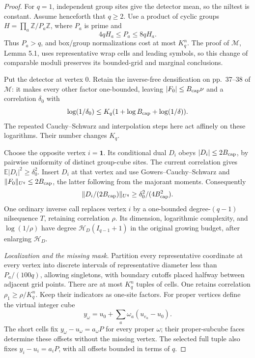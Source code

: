 \documentclass[11pt,a4paper]{article}
\theoremstyle{definition}
\newcommand{\M}{\mathcal M}
\newcommand{\E}{\mathbb E}
\newcommand{\Z}{\mathbb Z}
\begin{document}
\begin{proof}
For \(q=1\), independent group sites give the detector mean, so
the niltest is constant. Assume henceforth that \(q\ge2\).
Use a product of cyclic groups
\(H=\prod_a\Z/P_a\Z\), where \(P_a\) is prime and
\[
 4qH_a\le P_a\le8qH_a.
\]
Thus \(P_a>q\), and box/group normalizations cost at most
\(K_q^n\). The proof of \(\M\), Lemma 5.1, uses representative
wrap cells and leading symbols, so this change of comparable
moduli preserves its bounded-grid and marginal conclusions.

Put the detector at vertex \(0\). Retain the inverse-free
densification on pp.~37--38 of \(\M\): it makes every other
factor one-bounded, leaving \(|F_0|\le B_{\rm cap}\nu\) and a correlation
\(\delta_0\) with
\[
 \log(1/\delta_0)\le K_q(1+\log B_{\rm cap}+\log(1/\delta)).
\]
The repeated Cauchy--Schwarz and interpolation steps here act
affinely on these logarithms. Their number changes \(K_q\).

Choose the opposite vertex \(i=\mathbf1\). Its conditional
dual \(D_i\) obeys \(|D_i|\le2B_{\rm cap}\), by pairwise uniformity
of distinct group-cube sites. The current correlation gives
\(\E|D_i|^2\ge\delta_0^2\). Insert \(D_i\) at that vertex
and use Gowers--Cauchy--Schwarz and \(\|F_0\|_{U^q}\le2B_{\rm cap}\),
the latter following from the majorant moments. Consequently
\[
 \|D_i/(2B_{\rm cap})\|_{U^q}\ge\delta_0^2/(4B_{\rm cap}^2).
\]
One ordinary inverse call replaces vertex \(i\) by a
one-bounded degree-\((q-1)\) nilsequence \(T\), retaining
correlation \(\rho\). Its dimension, logarithmic complexity,
and \(\log(1/\rho)\) have degree
\(\mathcal H_D(I_{q-1}+1)\) in the original growing budget, after
enlarging \(\mathcal H_D\).

\textit{Localization and the missing mask.}
Partition every representative coordinate at every vertex into
discrete intervals of representative diameter less than
\(P_a/(100q)\), allowing singletons, with boundary cutoffs
placed halfway between adjacent grid points. There are at most \(K_q^n\) tuples of
cells. One retains correlation \(\rho_1\ge\rho/K_q^n\).
Keep their indicators as one-site factors. For proper vertices
define the virtual integer cube
\[
 y_\omega=u_0+\sum_a\omega_a(u_{e_a}-u_0).
\]
The short cells fix
\(y_\omega-u_\omega=a_\omega P\) for every proper
\(\omega\); their proper-subcube faces determine these offsets
without the missing vertex. The selected full tuple also fixes
\(y_i-u_i=a_iP\), with all offsets bounded in terms of \(q\).


\end{proof}
\end{document}
